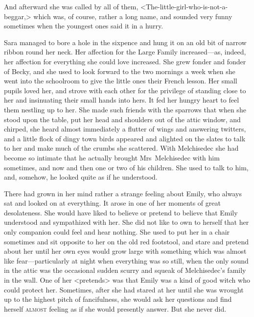 And afterward she was called by all of them, <The-little-girl-who-is-not-a-beggar,> which was, of course, rather a long name, and sounded very funny sometimes when the youngest ones said it in a hurry.

Sara managed to bore a hole in the sixpence and hung it on an old bit of narrow ribbon round her neck. Her affection for the Large Family increased—as, indeed, her affection for everything she could love increased. She grew fonder and fonder of Becky, and she used to look forward to the two mornings a week when she went into the schoolroom to give the little ones their French lesson. Her small pupils loved her, and strove with each other for the privilege of standing close to her and insinuating their small hands into hers. It fed her hungry heart to feel them nestling up to her. She made such friends with the sparrows that when she stood upon the table, put her head and shoulders out of the attic window, and chirped, she heard almost immediately a flutter of wings and answering twitters, and a little flock of dingy town birds appeared and alighted on the slates to talk to her and make much of the crumbs she scattered. With Melchisedec she had become so intimate that he actually brought Mrs~Melchisedec with him sometimes, and now and then one or two of his children. She used to talk to him, and, somehow, he looked quite as if he understood.

There had grown in her mind rather a strange feeling about Emily, who always sat and looked on at everything. It arose in one of her moments of great desolateness. She would have liked to believe or pretend to believe that Emily understood and sympathized with her. She did not like to own to herself that her only companion could feel and hear nothing. She used to put her in a chair sometimes and sit opposite to her on the old red footstool, and stare and pretend about her until her own eyes would grow large with something which was almost like fear—particularly at night when everything was so still, when the only sound in the attic was the occasional sudden scurry and squeak of Melchisedec's family in the wall. One of her <pretends> was that Emily was a kind of good witch who could protect her. Sometimes, after she had stared at her until she was wrought up to the highest pitch of fancifulness, she would ask her questions and find herself \textsc{almost} feeling as if she would presently answer. But she never did.

